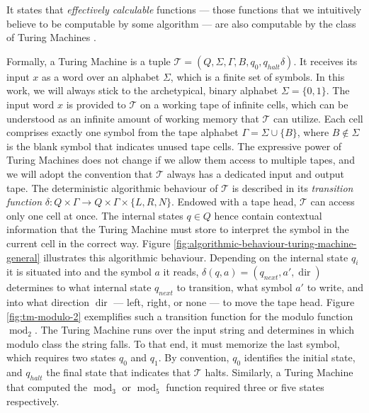 It states that \textit{effectively calculable} functions --- those functions that we intuitively believe to be computable by some algorithm --- are also computable by the class of Turing Machines \cite{turing2004intelligent}.

Formally, a Turing Machine is a tuple $\mathcal{T}=(Q,\Sigma,\Gamma,B,q_0,q_{halt}\delta)$.
It receives its input $x$ as a word over an alphabet $\Sigma$, which is a finite set of symbols. 
In this work, we will always stick to the archetypical, binary alphabet $\Sigma=\{0,1\}$.
The input word $x$ is provided to $\mathcal{T}$ on a working tape of infinite cells, which can be understood as an infinite amount of working memory that $\mathcal{T}$ can utilize. Each cell comprises exactly one symbol from the tape alphabet $\Gamma=\Sigma\cup\{B\}$, where $B\notin\Sigma$ is the blank symbol that indicates unused tape cells.
The expressive power of Turing Machines does not change if we allow them access to multiple tapes, and we will adopt the convention that $\mathcal{T}$ always has a dedicated input and output tape.
The deterministic algorithmic behaviour of $\mathcal{T}$ is described in its \textit{transition function} $\delta:Q\times \Gamma \to Q \times \Gamma \times \{L,R,N\}$.
Endowed with a tape head, $\mathcal{T}$ can access only one cell at once. 
The internal states $q\in Q$ hence contain contextual information that the Turing Machine must store to interpret the symbol in the current cell in the correct way.
Figure \ref{fig:algorithmic-behaviour-turing-machine-general} illustrates this algorithmic behaviour.
Depending on the internal state $q_i$ it is situated into and the symbol $a$ it reads, $\delta(q,a)=(q_{next},a',\operatorname{dir})$ determines to what internal state $q_{next}$ to transition, what symbol $a'$ to write, and into what direction $\operatorname{dir}$ --- left, right, or none --- to move the tape head.
Figure \ref{fig:tm-modulo-2} exemplifies such a transition function for the modulo function $\operatorname{mod}_2$.
The Turing Machine runs over the input string and determines in which modulo class the string falls.
To that end, it must memorize the last symbol, which requires two states $q_0$ and $q_1$.
By convention, $q_0$ identifies the initial state, and $q_{halt}$ the final state that indicates that $\mathcal{T}$ halts.
Similarly, a Turing Machine that computed the $\operatorname{mod}_3$ or $\operatorname{mod}_5$ function required three or five states respectively.

